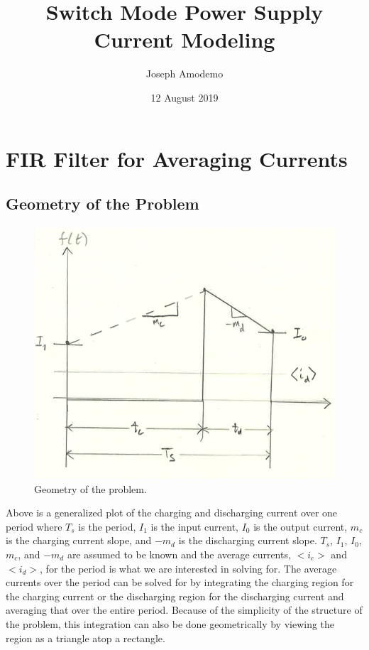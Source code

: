 \documentclass[10pt]{article}
\title{Switch Mode Power Supply Current Modeling}
\author{Joseph Amodemo}
\date{12 August 2019}
\begin{document}
\maketitle
\tableofcontents
\listoffigures

\twocolumn

\section{FIR Filter for Averaging Currents}
\subsection{Geometry of the Problem}
\paragraph{}
\begin{figure}[!h]
    \centering
    \includegraphics[width=0.95\linewidth]{Geometry.PNG}
    \caption{Geometry of the problem.}
    \label{Geometry}
\end{figure}

Above is a generalized plot of the charging and discharging current over one period where \(T_s\) is the period, \(I_1\) is the input current, \(I_0\) is the output current, \(m_c\) is the charging current slope, and \(-m_d\) is the discharging current slope. \(T_s\), \(I_1\), \(I_0\), \(m_c\), and \(-m_d\) are assumed to be known and the average currents, \(<i_c>\) and \(<i_d>\), for the period is what we are interested in solving for. The average currents over the period can be solved for by integrating the charging region for the charging current or the discharging region for the discharging current and averaging that over the entire period. Because of the simplicity of the structure of the problem, this integration can also be done geometrically by viewing the region as a triangle atop a rectangle. 
\end{document}
